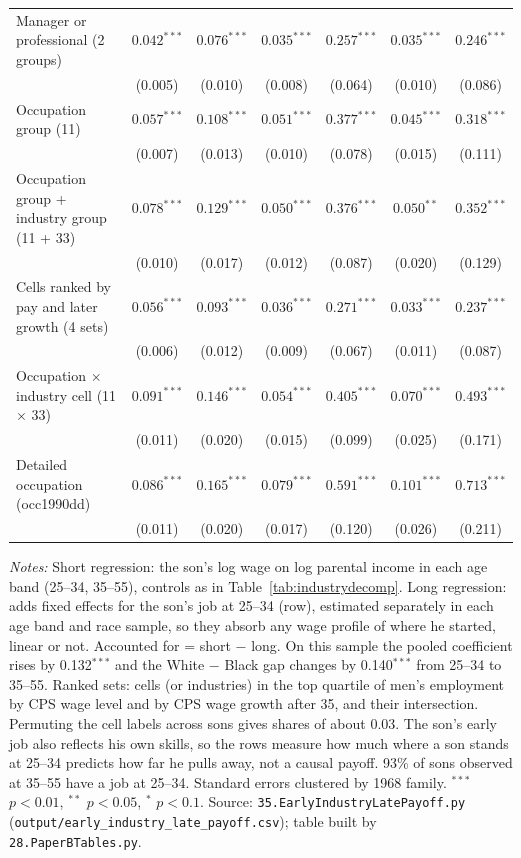 \begin{table}[!htbp]
{{\begin{tabular}{lcccccc}
Manager or professional (2 groups) & $0.042^{***}$ & $0.076^{***}$ & $0.035^{***}$ & $0.257^{***}$ & $0.035^{***}$ & $0.246^{***}$ \\
 & (0.005) & (0.010) & (0.008) & (0.064) & (0.010) & (0.086) \\
Occupation group (11) & $0.057^{***}$ & $0.108^{***}$ & $0.051^{***}$ & $0.377^{***}$ & $0.045^{***}$ & $0.318^{***}$ \\
 & (0.007) & (0.013) & (0.010) & (0.078) & (0.015) & (0.111) \\
Occupation group + industry group (11 + 33) & $0.078^{***}$ & $0.129^{***}$ & $0.050^{***}$ & $0.376^{***}$ & $0.050^{**}$ & $0.352^{***}$ \\
 & (0.010) & (0.017) & (0.012) & (0.087) & (0.020) & (0.129) \\
Cells ranked by pay and later growth (4 sets) & $0.056^{***}$ & $0.093^{***}$ & $0.036^{***}$ & $0.271^{***}$ & $0.033^{***}$ & $0.237^{***}$ \\
 & (0.006) & (0.012) & (0.009) & (0.067) & (0.011) & (0.087) \\
Occupation $\times$ industry cell (11 $\times$ 33) & $0.091^{***}$ & $0.146^{***}$ & $0.054^{***}$ & $0.405^{***}$ & $0.070^{***}$ & $0.493^{***}$ \\
 & (0.011) & (0.020) & (0.015) & (0.099) & (0.025) & (0.171) \\
Detailed occupation (occ1990dd) & $0.086^{***}$ & $0.165^{***}$ & $0.079^{***}$ & $0.591^{***}$ & $0.101^{***}$ & $0.713^{***}$ \\
 & (0.011) & (0.020) & (0.017) & (0.120) & (0.026) & (0.211) \\
\bottomrule
\end{tabular}}}
\par\smallskip
\begin{minipage}{\textwidth}\footnotesize \textit{Notes:} Short regression: the son's log wage on log parental income in each age band (25--34, 35--55), controls as in Table~\ref{tab:industrydecomp}. Long regression: adds fixed effects for the son's job at 25--34 (row), estimated separately in each age band and race sample, so they absorb any wage profile of where he started, linear or not. Accounted for = short $-$ long. On this sample the pooled coefficient rises by 0.132$^{***}$ and the White $-$ Black gap changes by 0.140$^{***}$ from 25--34 to 35--55. Ranked sets: cells (or industries) in the top quartile of men's employment by CPS wage level and by CPS wage growth after 35, and their intersection. Permuting the cell labels across sons gives shares of about 0.03. The son's early job also reflects his own skills, so the rows measure how much where a son stands at 25--34 predicts how far he pulls away, not a causal payoff. 93\% of sons observed at 35--55 have a job at 25--34. Standard errors clustered by 1968 family. $^{***}$ $p<0.01$, $^{**}$ $p<0.05$, $^{*}$ $p<0.1$. Source: \texttt{35.EarlyIndustryLatePayoff.py} (\texttt{output/early\_industry\_late\_payoff.csv}); table built by \texttt{28.PaperBTables.py}.\end{minipage}
\end{table}
